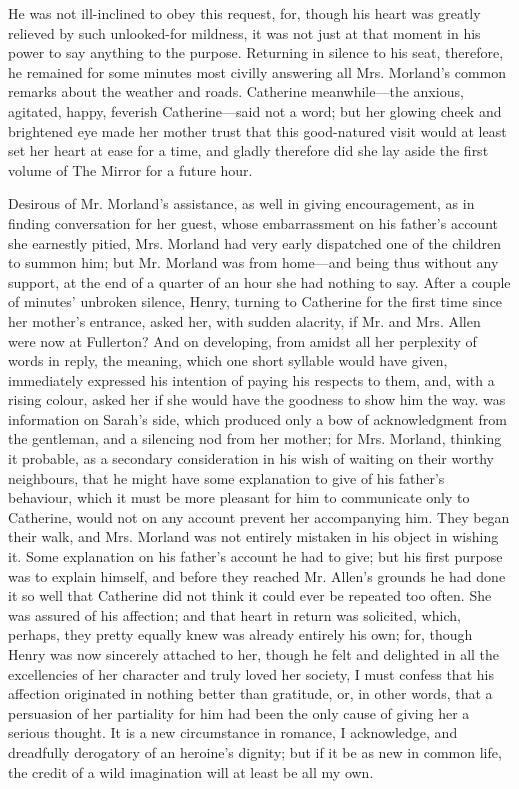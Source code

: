 He was not ill-inclined to obey this request, for, though his heart was greatly relieved by such unlooked-for mildness, it was not just at that moment in his power to say anything to the purpose. Returning in silence to his seat, therefore, he remained for some minutes most civilly answering all Mrs. Morland's common remarks about the weather and roads. Catherine meanwhile---the anxious, agitated, happy, feverish Catherine---said not a word; but her glowing cheek and brightened eye made her mother trust that this good-natured visit would at least set her heart at ease for a time, and gladly therefore did she lay aside the first volume of The Mirror for a future hour.

Desirous of Mr. Morland's assistance, as well in giving encouragement, as in finding conversation for her guest, whose embarrassment on his father's account she earnestly pitied, Mrs. Morland had very early dispatched one of the children to summon him; but Mr. Morland was from home---and being thus without any support, at the end of a quarter of an hour she had nothing to say. After a couple of minutes' unbroken silence, Henry, turning to Catherine for the first time since her mother's entrance, asked her, with sudden alacrity, if Mr. and Mrs. Allen were now at Fullerton? And on developing, from amidst all her perplexity of words in reply, the meaning, which one short syllable would have given, immediately expressed his intention of paying his respects to them, and, with a rising colour, asked her if she would have the goodness to show him the way.  was information on Sarah's side, which produced only a bow of acknowledgment from the gentleman, and a silencing nod from her mother; for Mrs. Morland, thinking it probable, as a secondary consideration in his wish of waiting on their worthy neighbours, that he might have some explanation to give of his father's behaviour, which it must be more pleasant for him to communicate only to Catherine, would not on any account prevent her accompanying him. They began their walk, and Mrs. Morland was not entirely mistaken in his object in wishing it. Some explanation on his father's account he had to give; but his first purpose was to explain himself, and before they reached Mr. Allen's grounds he had done it so well that Catherine did not think it could ever be repeated too often. She was assured of his affection; and that heart in return was solicited, which, perhaps, they pretty equally knew was already entirely his own; for, though Henry was now sincerely attached to her, though he felt and delighted in all the excellencies of her character and truly loved her society, I must confess that his affection originated in nothing better than gratitude, or, in other words, that a persuasion of her partiality for him had been the only cause of giving her a serious thought. It is a new circumstance in romance, I acknowledge, and dreadfully derogatory of an heroine's dignity; but if it be as new in common life, the credit of a wild imagination will at least be all my own.

